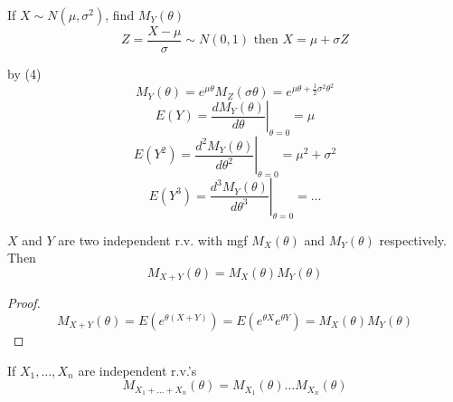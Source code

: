\begin{exmp}
If $X \sim N(\mu,\sigma^2)$, find $M_Y(\theta)$
\[Z=\frac{X-\mu}{\sigma}\sim N(0,1) \text{ then } X=\mu+\sigma Z\]

by (4)
\[M_Y(\theta)=e^{\mu \theta} M_Z(\sigma \theta)=e^{\mu\theta+\frac{1}{2} \sigma^2\theta^2}\]
\[E(Y)=\left.\frac{d M_Y(\theta)}{d \theta}\right|_{\theta=0}=\mu\]
\[E(Y^2)=\left.\frac{d^2 M_Y(\theta)}{d \theta^2}\right|_{\theta=0}=\mu^2+\sigma^2\]
\[E(Y^3)=\left.\frac{d^3 M_Y(\theta)}{d \theta^3}\right|_{\theta=0}=\dots\]
\end{exmp}

\begin{theo}
$X$ and $Y$ are two independent r.v. with mgf $M_X(\theta)$ and $M_Y(\theta)$ respectively. Then 
\[M_{X+Y}(\theta)=M_X(\theta)M_Y(\theta)\]
\begin{proof}
\[M_{X+Y}(\theta)=E(e^{\theta(X+Y)})=E(e^{\theta X} e^{\theta Y})=M_X(\theta)M_Y(\theta)\]
\end{proof}
\end{theo}

\begin{coro}
If $X_1,\dots,X_n$ are independent r.v.'s
\[M_{X_1+\dots+X_n}(\theta)=M_{X_1}(\theta)\dots M_{X_n}(\theta)\]
\end{coro}

